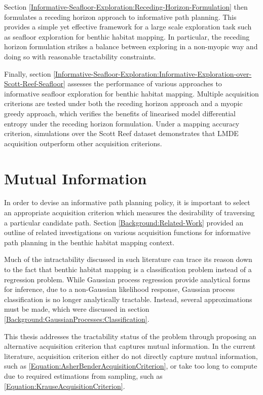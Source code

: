 	Section \ref{Informative-Seafloor-Exploration:Receding-Horizon-Formulation} then formulates a receding horizon approach to informative path planning. This provides a simple yet effective framework for a large scale exploration task such as seafloor exploration for benthic habitat mapping. In particular, the receding horizon formulation strikes a balance between exploring in a non-myopic way and doing so with reasonable tractability constraints.
	
	Finally, section \ref{Informative-Seafloor-Exploration:Informative-Exploration-over-Scott-Reef-Seafloor} assesses the performance of various approaches to informative seafloor exploration for benthic habitat mapping. Multiple acquisition criterions are tested under both the receding horizon approach and a myopic greedy approach, which verifies the benefits of linearised model differential entropy under the receding horizon formulation. Under a mapping accuracy criterion, simulations over the Scott Reef dataset demonstrates that LMDE acquisition outperform other acquisition criterions.
	
	\section{Mutual Information}
	\label{Informative-Seafloor-Exploration:Mutual-Information}
		
		In order to devise an informative path planning policy, it is important to select an appropriate acquisition criterion which measures the desirability of traversing a particular candidate path. Section \ref{Background:Related-Work} provided an outline of related investigations on various acquisition functions for informative path planning in the benthic habitat mapping context. 
		
		Much of the intractability discussed in such literature can trace its reason down to the fact that benthic habitat mapping is a classification problem instead of a regression problem. While Gaussian process regression provide analytical forms for inference, due to a non-Gaussian likelihood response, Gaussian process classification is no longer analytically tractable. Instead, several approximations must be made, which were discussed in section \ref{Background:GaussianProcesses:Classification}.
		
		This thesis addresses the tractability status of the problem through proposing an alternative acquisition criterion that captures mutual information. In the current literature, acquisition criterion either do not directly capture mutual information, such as \eqref{Equation:AsherBenderAcquisitionCriterion}, or take too long to compute due to required estimations from sampling, such as \eqref{Equation:KrauseAcquisitionCriterion}. 
		

